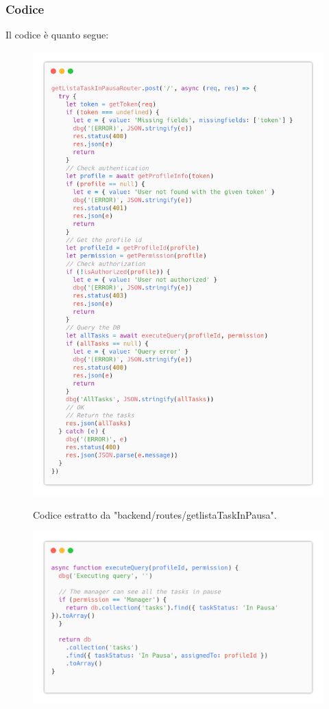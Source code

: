 \documentclass{report}
\begin{document}
\subsubsection*{Codice}

Il codice è quanto segue:
\begin{figure}[H]
	\centering\includegraphics[width=1\textwidth]{images/code_in_pausa.png}

	Codice estratto da "backend/routes/getlistaTaskInPausa".
\end{figure}
\begin{figure}[H]
	\centering\includegraphics[width=1\textwidth]{images/code_in_paus2.png}
\end{figure}
\end{document}
